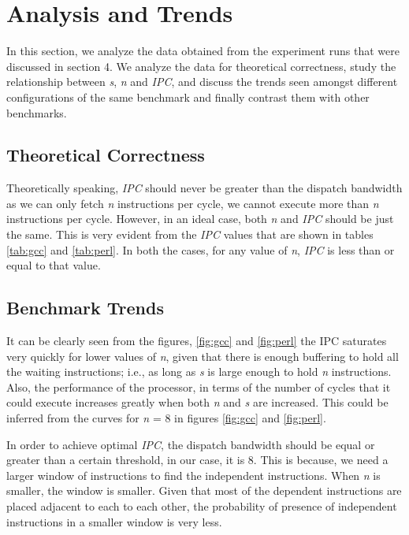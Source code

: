 \section{Analysis and Trends}
In this section, we analyze the data obtained from the experiment runs that were discussed in section 4. We analyze the data for theoretical correctness, study the relationship between \textit{s}, \textit{n} and \textit{IPC}, and discuss the trends seen amongst different configurations of the same benchmark and finally contrast them with other benchmarks.


\subsection{Theoretical Correctness}
Theoretically speaking, \textit{IPC} should never be greater than the dispatch bandwidth as we can only fetch \textit{n} instructions per cycle, we cannot execute more than \textit{n} instructions per cycle. However, in an ideal case, both \textit{n} and \textit{IPC} should be just the same. This is very evident from the \textit{IPC} values that are shown in tables \ref{tab:gcc} and \ref{tab:perl}. In both the cases, for any value of \textit{n}, \textit{IPC} is less than or equal to that value. 


\subsection{Benchmark Trends}
It can be clearly seen from the figures, \ref{fig:gcc} and \ref{fig:perl} the IPC saturates very quickly for lower values of \textit{n}, given that there is enough buffering to hold all the waiting instructions; i.e., as long as \textit{s} is large enough to hold \textit{n} instructions. Also, the performance of the processor, in terms of the number of cycles that it could execute increases greatly when both \textit{n} and \textit{s} are increased. This could be inferred from the curves for \textit{n} = 8 in figures \ref{fig:gcc} and \ref{fig:perl}.

In order to achieve optimal \textit{IPC}, the dispatch bandwidth should be equal or greater than a certain threshold, in our case, it is 8. This is because, we need a larger window of instructions to find the independent instructions. When \textit{n} is smaller, the window is smaller. Given that most of the dependent instructions are placed adjacent to each to each other, the probability of presence of independent instructions in a smaller window is very less.


